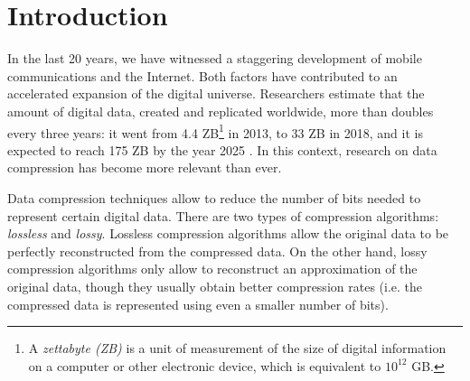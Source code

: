 
\chapter{Introduction} %
\label{intro:intro} %








\newcommand{\maxerror}{\textit{$\epsilon$}\xspace}
\newcommand{\maskalgo}{\textit{M}\xspace}
\newcommand{\NOmaskalgo}{\textit{NM}\xspace}

\newcommand{\zetafoot}{\footnote{A \textit{zettabyte (ZB)} is a unit of measurement of the size of digital information on a computer or other electronic device, which is equivalent to $10^{12}$ GB.} }


In the last 20 years, we have witnessed a staggering development of mobile communications and the Internet. Both factors have contributed to an accelerated expansion of the digital universe. Researchers estimate that the amount of digital data, created and replicated worldwide, more than doubles every three years: it went from 4.4 ZB\zetafoot in 2013, to 33 ZB in 2018, and it is expected to reach 175 ZB by the year 2025 \cite{Digitalization1, Digitalization2}. In this context, research on data compression has become more relevant than ever.


Data compression techniques allow to reduce the number of bits needed to represent certain digital data. There are two types of compression algorithms: \textit{lossless} and \textit{lossy}. Lossless compression algorithms allow the original data to be perfectly reconstructed from the compressed data. On the other hand, lossy compression algorithms only allow to reconstruct an approximation of the original data, though they usually obtain better compression rates (i.e. the compressed data is represented using even a smaller number of bits).


